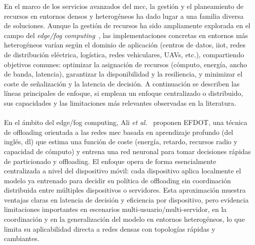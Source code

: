 En el marco de los servicios avanzados del \gls{mcc}, la gestión y el planeamiento de recursos en entornos densos y heterogéneos ha dado lugar a una familia diversa de soluciones. Aunque la gestión de recursos ha sido ampliamente explorada en el campo del \textit{edge/fog computing}~\cite{Bachiega23}, las implementaciones concretas en entornos más heterogéneos varían según el dominio de aplicación (centros de datos, \gls{iiot}, redes de distribución eléctrica, logística, redes vehiculares, UAVs, etc.), compartiendo objetivos comunes: optimizar la asignación de recursos (cómputo, energía, ancho de banda, latencia), garantizar la disponibilidad y la resiliencia, y minimizar el coste de señalización y la latencia de decisión. A continuación se describen las líneas principales de enfoque, si emplean un enfoque centralizado o distribuido, sus capacidades y las limitaciones más relevantes observadas en la literatura.\\
\\
En el ámbito del edge/fog computing, Ali \textit{et al.}~\cite{Ali21} proponen EFDOT, una técnica de offloading orientada a las redes \gls{mec} basada en aprendizaje profundo (del inglés, \gls{dl}) que estima una función de coste (energía, retardo, recursos radio y capacidad de cómputo) y entrena una red neuronal para tomar decisiones rápidas de particionado y offloading. El enfoque opera de forma esencialmente centralizada a nivel del dispositivo móvil: cada dispositivo aplica localmente el modelo ya entrenado para decidir su política de offloading sin coordinación distribuida entre múltiples dispositivos o servidores. Esta aproximación muestra ventajas claras en latencia de decisión y eficiencia por dispositivo, pero evidencia limitaciones importantes en escenarios multi-usuario/multi-servidor, en la coordinación y en la generalización del modelo en entornos heterogéneos, lo que limita su aplicabilidad directa a redes densas con topologías rápidas y cambiantes. \\
\\

